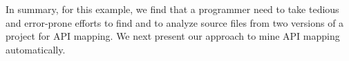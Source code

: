 In summary, for this example, we find that a programmer need to take
tedious and error-prone efforts to find and to analyze source files
from two versions of a project for API mapping. We next present our
approach to mine API mapping automatically.
%
%
%
%
%
%
